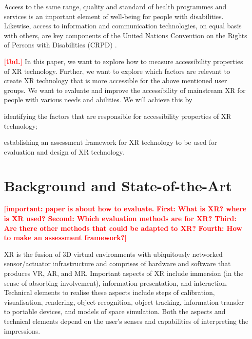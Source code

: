\documentclass[11pt,english]{nik}
\newcommand{\WVL}[1]{\textbf{\textcolor{red}{#1}}}
\begin{document}
Access to the same range, quality and standard of health programmes and services is an important element of well-being
for people with disabilities. Likewise, access to information and communication technologies, on equal basis with
others, are key components of the United Nations Convention on the Rights of Persons with Disabilities
(CRPD) \autocite{UNDisabilities}.

\WVL{[tbd.]} In this paper, we want to explore how to measure accessibility properties of XR technology. 
Further, we want to explore which factors are relevant to create XR technology that is more accessible 
for the above mentioned user groups. 
%
We want to evaluate and improve the accessibility of mainstream XR for people with various needs
and abilities. We will achieve this by 
\begin{enumerate*}[label={\alph*)},ref=\alph*]
\item
identifying the factors that are responsible for accessibility properties of XR technology;
\item
establishing an assessment framework for XR technology to be used for evaluation and design of XR technology.%
\end{enumerate*}


\section{Background and State-of-the-Art}
\WVL{[important: paper is about how to evaluate. First: What is XR? where is XR used? Second: Which evaluation methods are for XR? Third: Are there other methods that could be adapted to XR? Fourth: How to make an assessment framework?]}

XR
is the fusion of 3D virtual environments with ubiquitously networked
sensor/actuator infrastructure \autocite{paradiso2009guest}
and comprises of hardware and software that produces VR, AR, and MR.
Important aspects of XR include immersion (in the sense of absorbing involvement), information presentation, and interaction. 
Technical elements to realise these aspects include steps of 
calibration, visualisation, rendering, object recognition, object tracking, information transfer to portable devices, 
and models of space simulation.
Both the aspects and technical elements depend on the user's senses and capabilities of interpreting the impressions. 
\end{document}
